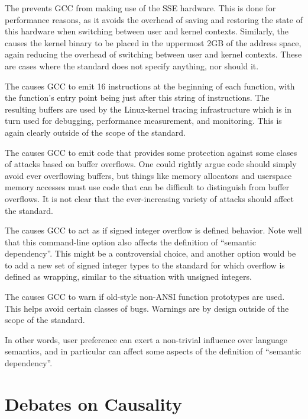\documentclass[10]{article}
\begin{document}
The  prevents GCC from making use of the SSE hardware.
This is done for performance reasons, as it avoids the overhead of
saving and restoring the state of this hardware when switching between
user and kernel contexts.
Similarly, the  causes the kernel binary to be
placed in the uppermost 2GB of the address space, again reducing
the overhead of switching between user and kernel contexts.
These are cases where the standard does not specify anything, nor
should it.

The  causes GCC to emit 16
 instructions at the beginning of each function, with
the function's entry point being just after this string of 
instructions.
The resulting buffers are used by the Linux-kernel tracing infrastructure
which is in turn used for debugging, performance measurement, and
monitoring.
This is again clearly outside of the scope of the standard.

The  causes GCC to emit code that provides
some protection against some clases of attacks based on buffer overflows.
One could rightly argue code should simply avoid ever overflowing buffers,
but things like memory allocators and userspace memory accesses must
use code that can be difficult to distinguish from buffer overflows.
It is not clear that the ever-increasing variety of attacks should
affect the standard.

The  causes GCC to act as if signed integer
overflow is defined behavior.
Note well that this command-line option also affects the definition of
``semantic dependency''.
This might be a controversial choice, and another option would be to add
a new set of signed integer types to the standard for which overflow is
defined as wrapping, similar to the situation with unsigned integers.

The  causes GCC to warn if old-style
non-ANSI function prototypes are used.
This helps avoid certain classes of bugs.
Warnings are by design outside of the scope of the standard.

In other words, user preference can exert a non-trivial influence over
language semantics, and in particular can affect some aspects of the
definition of ``semantic dependency''.

\clearpage

\section{Debates on Causality}
\label{sec:Debates on Causality}
\end{document}
